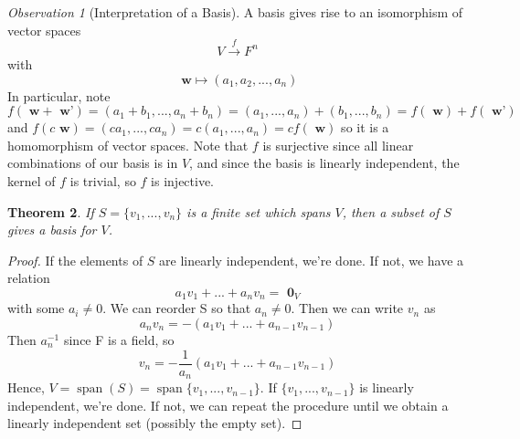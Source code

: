\documentclass[12pt]{article}
\newtheorem{thm}{Theorem}[section]
\theoremstyle{definition}
\theoremstyle{remark}
\newtheorem{obs}[thm]{Observation}
\numberwithin{equation}{section}
\newcommand\B[1]{\textbf{ #1}}
\DeclareMathOperator{\spn}{span}
\begin{document}
\vspace{15pt}

\begin{obs}[Interpretation of a Basis]
        A basis gives rise to an isomorphism of vector spaces \begin{equation}
                V \xrightarrow{f} F^n
        \end{equation}
        with \begin{equation}
                \B{w} \mapsto (a_1,a_2,...,a_n)
        \end{equation}
        In particular, note $f(\B{w} + \B{w'}) = (a_1+b_1,...,a_n+b_n) = (a_1,...,a_n) + (b_1,...,b_n) = f(\B{w}) + f(\B{w'})$ and $f(c\B{w}) = (ca_1,...,ca_n) = c(a_1,...,a_n) = cf(\B{w})$ so it is a homomorphism of vector spaces. Note that $f$ is surjective since all linear combinations of our basis is in $V$, and since the basis is linearly independent, the kernel of $f$ is trivial, so $f$ is injective. 
\end{obs}

\vspace{15pt}

\begin{thm}
        If $S = \{v_1,...,v_n\}$ is a finite set which spans $V$, then a subset of $S$ gives a basis for $V$.
\end{thm}
\begin{proof}
        If the elements of $S$ are linearly independent, we're done. If not, we have a relation $$a_1v_1+...+a_nv_n = \B{0}_V$$ with some $a_i \neq 0$. We can reorder S so that $a_n \neq 0$. Then we can write $v_n$ as \begin{equation*}
                a_nv_n = -(a_1v_1+...+a_{n-1}v_{n-1})
        \end{equation*}
        Then $a_n^{-1}$ since F is a field, so \begin{equation*}
                v_n = -\frac{1}{a_n}(a_1v_1+...+a_{n-1}v_{n-1})
        \end{equation*}
        Hence, $V = \spn(S) = \spn\{v_1,...,v_{n-1}\}$. If $\{v_1,...,v_{n-1}\}$ is linearly independent, we're done. If not, we can repeat the procedure until we obtain a linearly independent set (possibly the empty set).
\end{proof}

\vspace{15pt}
\end{document}
